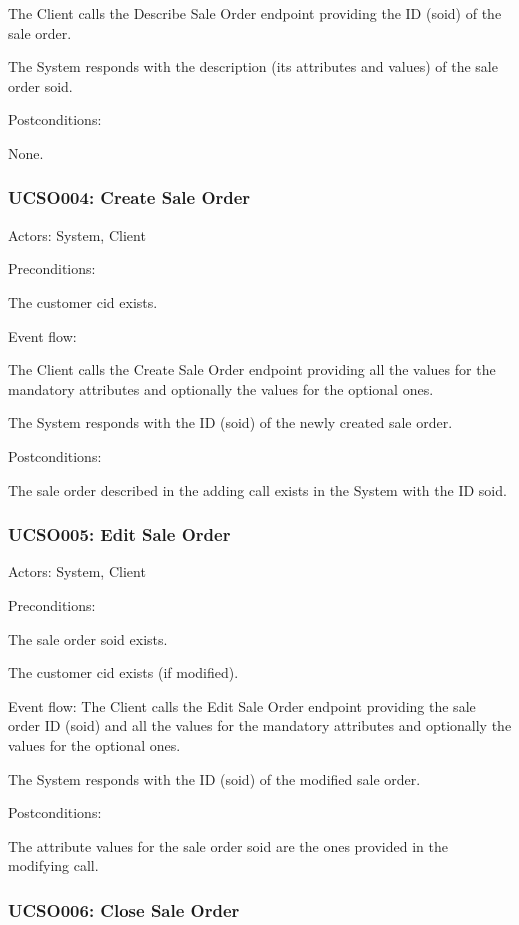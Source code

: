 \ucitem The Client calls the Describe Sale Order endpoint providing the ID (soid) of the sale order.

\ucitem The System responds with the description (its attributes and values) of the sale order soid.

Postconditions:

\ucitem None.

\subsubsection{UCSO004: Create Sale Order}
\label{UCSO004}

Actors: System, Client

Preconditions:

\ucitem The customer cid exists.

Event flow:

\ucitem The Client calls the Create Sale Order endpoint providing all the values for the mandatory attributes and optionally the values for the optional ones.

\ucitem The System responds with the ID (soid) of the newly created sale order.

Postconditions:

\ucitem The sale order described in the adding call exists in the System with the ID soid.

\subsubsection{UCSO005: Edit Sale Order}
\label{UCSO005}

Actors: System, Client

Preconditions:

\ucitem The sale order soid exists.

\ucitem The customer cid exists (if modified).

Event flow:
\ucitem The Client calls the Edit Sale Order endpoint providing the sale order ID (soid) and all the values for the mandatory attributes and optionally the values for the 
optional ones.

\ucitem The System responds with the ID (soid) of the modified sale order.

Postconditions:

\ucitem The attribute values for the sale order soid are the ones provided in the modifying call.

\subsubsection{UCSO006: Close Sale Order}
\label{UCSO006}

